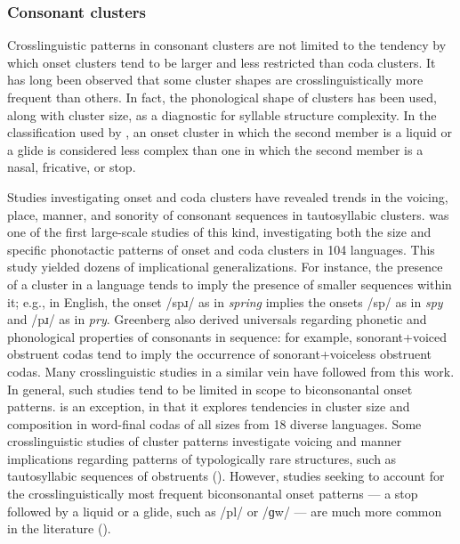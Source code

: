 \subsubsection{{Consonant} {clusters}}\label{sec:1.1.2.3}

  Crosslinguistic patterns in consonant clusters are not limited to the tendency by which onset clusters tend to be larger and less restricted than coda clusters. It has long been observed that some cluster shapes are crosslinguistically more frequent than others. In fact, the phonological shape of clusters has been used, along with cluster size, as a diagnostic for syllable structure complexity. In the classification used by \citet{Maddieson2013a}, an onset cluster in which the second member is a liquid or a glide is considered less complex than one in which the second member is a nasal, fricative, or stop.

  Studies investigating onset and coda clusters have revealed trends in the voicing, place, manner, and sonority of consonant sequences in tautosyllabic clusters. \citet{Greenberg19651978} was one of the first large-scale studies of this kind, investigating both the size and specific phonotactic patterns of onset and coda clusters in 104 languages. This study yielded dozens of implicational generalizations. For instance, the presence of a cluster in a language tends to imply the presence of smaller sequences within it; e.g., in English, the onset /spɹ/ as in \textit{spring} implies the onsets /sp/ as in \textit{spy} and /pɹ/ as in \textit{pry}. Greenberg also derived universals regarding phonetic and phonological properties of consonants in sequence: for example, sonorant+voiced obstruent codas tend to imply the occurrence of sonorant+voiceless obstruent codas. Many crosslinguistic studies in a similar vein have followed from this work. In general, such studies tend to be limited in scope to biconsonantal onset patterns. \citet{VanDam2004} is an exception, in that it explores tendencies in cluster size and composition in word-final codas of all sizes from 18 diverse languages. Some crosslinguistic studies of cluster patterns investigate voicing and manner implications regarding patterns of typologically rare structures, such as tautosyllabic sequences of obstruents (\citealt{Morelli1999,Morelli2003,Kreitman2008}). However, studies seeking to account for the crosslinguistically most frequent biconsonantal onset patterns — a stop followed by a liquid or a glide, such as /pl/ or /ɡw/ — are much more common in the literature (\citealt{Clements1990,BerentEtAl2008,BerentEtAl2011,Parker2012,Vennemann2012}). 


